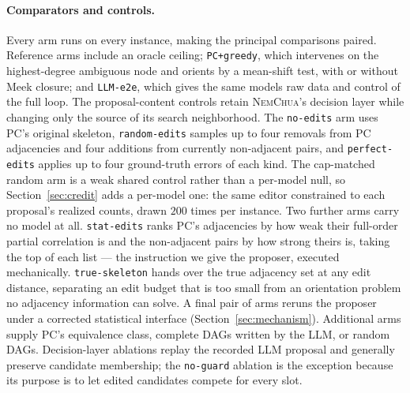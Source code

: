 \documentclass{article}
\newcommand{\nem}{\textsc{NemChua}}
\begin{document}
\paragraph{Comparators and controls.}
Every arm runs on every instance, making the principal comparisons paired. Reference arms include
an oracle ceiling; \texttt{PC+greedy}, which intervenes on the highest-degree ambiguous node and
orients by a mean-shift test, with or without Meek closure; and \texttt{LLM-e2e}, which gives the
same models raw data and control of the full loop. The proposal-content controls retain \nem's
decision layer while changing only the source of its search neighborhood. The \texttt{no-edits}
arm uses PC's original skeleton, \texttt{random-edits} samples up to four removals from PC
adjacencies and four additions from currently non-adjacent pairs, and \texttt{perfect-edits} applies
up to four ground-truth errors of each kind. The cap-matched random arm is a weak shared control
rather than a per-model null, so Section~\ref{sec:credit} adds a per-model one: the same editor
constrained to each proposal's realized counts, drawn $200$ times per instance. Two further arms
carry no model at all. \texttt{stat-edits} ranks PC's adjacencies by how weak their full-order
partial correlation is and the non-adjacent pairs by how strong theirs is, taking the top of each
list --- the instruction we give the proposer, executed mechanically. \texttt{true-skeleton} hands
over the true adjacency set at any edit distance, separating an edit budget that is too small from
an orientation problem no adjacency information can solve. A final pair of arms reruns the proposer
under a corrected statistical interface (Section~\ref{sec:mechanism}). Additional arms supply PC's
equivalence class, complete DAGs written by the LLM, or random DAGs. Decision-layer ablations replay
the recorded LLM proposal and generally preserve candidate membership; the \texttt{no-guard}
ablation is the exception because its purpose is to let edited candidates compete for every slot.
\end{document}
